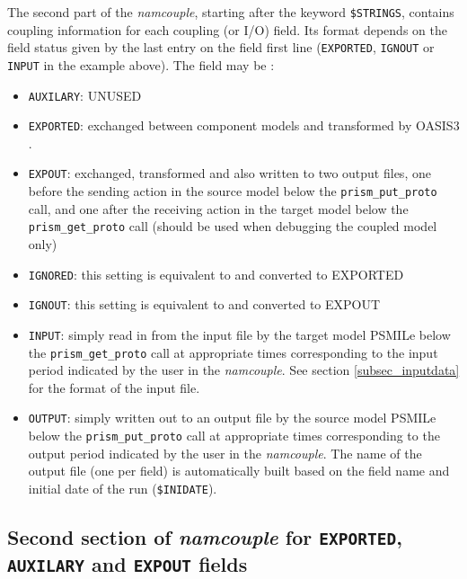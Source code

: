 The second part of the {\it namcouple}, starting after the keyword
{\tt \$STRINGS}, contains coupling information for each coupling (or
I/O) field.  Its format depends on the field status given by the last
entry on the field first line ({\tt EXPORTED}, {\tt IGNOUT} or {\tt
INPUT} in the example above). The field may be :

\begin{itemize}
\item {\tt AUXILARY}: UNUSED
\item {\tt EXPORTED}: exchanged between component models and
  transformed by OASIS3 .
\item {\tt EXPOUT}: exchanged, transformed and also written to two
  output files, one before the sending action in the source model
  below the {\tt prism\_put\_proto} call, and one after the receiving
  action in the target model below the {\tt prism\_get\_proto} call (should
  be used when debugging the coupled model only)
\item {\tt IGNORED}: this setting is equivalent to and converted to EXPORTED
\item {\tt IGNOUT}: this setting is equivalent to and converted to EXPOUT
\item {\tt INPUT}: simply read in from the input file by the target
  model PSMILe below the {\tt prism\_get\_proto} call at appropriate
  times corresponding to the input period indicated by the user in the
  {\it namcouple}. See section
  \ref{subsec_inputdata} for the format of the input file.
\item {\tt OUTPUT}: simply written out to an output file by the source
  model PSMILe below the {\tt prism\_put\_proto} call at appropriate
  times corresponding to the output period indicated by the user in
  the {\it namcouple}. The name of the output file (one per field) is
  automatically built based on the field name and initial date of the
  run ({\tt \$INIDATE}).

\end{itemize}

\subsection{Second section of {\it namcouple} for {\tt EXPORTED}, {\tt
      AUXILARY} and {\tt EXPOUT} fields}
\label{subsubsec_secondEXPORTED}

